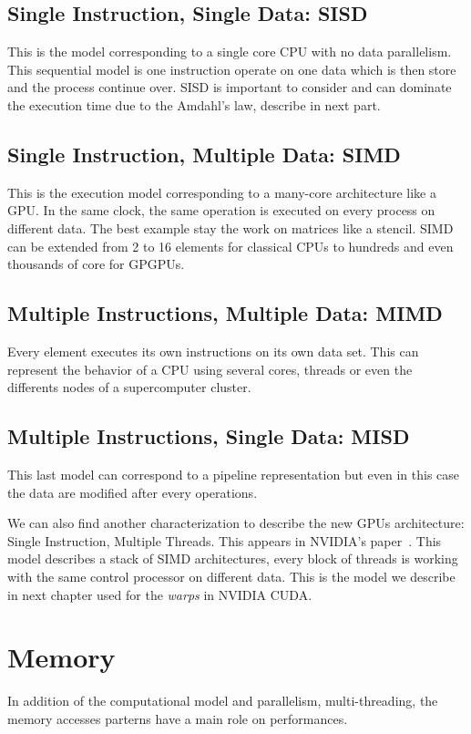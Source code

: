 \subsection{Single Instruction, Single Data: SISD}
This is the model corresponding to a single core CPU with no data parallelism. 
This sequential model is one instruction operate on one data which is then store and the process continue over. 
SISD is important to consider and can dominate the execution time due to the Amdahl's law, describe in next part. 

\subsection{Single Instruction, Multiple Data: SIMD}
This is the execution model corresponding to a many-core architecture like a GPU. 
In the same clock, the same operation is executed on every process on different data. 
The best example stay the work on matrices like a stencil. 
SIMD can be extended from 2 to 16 elements for classical CPUs to hundreds and even thousands of core for GPGPUs. 

\subsection{Multiple Instructions, Multiple Data: MIMD}
Every element executes its own instructions on its own data set. 
This can represent the behavior of a CPU using several cores, threads or even the differents nodes of a supercomputer cluster. 

\subsection{Multiple Instructions, Single Data: MISD}
This last model can correspond to a pipeline representation but even in this case the data are modified after every operations. 

We can also find another characterization to describe the new GPUs architecture: Single Instruction, Multiple Threads. 
This appears in NVIDIA's paper~\cite{lindholm2008nvidia}. 
This model describes a stack of SIMD architectures, every block of threads is working with the same control processor on different data. 
This is the model we describe in next chapter used for the \textit{warps} in NVIDIA CUDA.

\section{Memory}
In addition of the computational model and parallelism, multi-threading, the memory accesses parterns have a main role on performances. 

